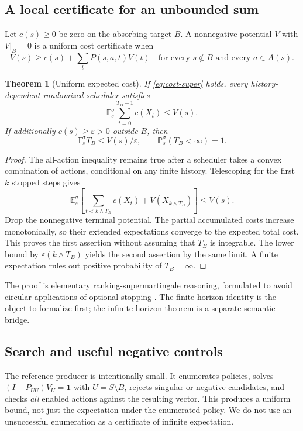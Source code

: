 \documentclass[11pt,letterpaper]{article}
\newtheorem{theorem}{Theorem}[section]
\theoremstyle{definition}\newtheorem{definition}[theorem]{Definition}
\theoremstyle{remark}\newtheorem{remark}[theorem]{Remark}
\newcommand{\E}{\mathbb E}\newcommand{\Prob}{\mathbb P}
\begin{document}
\subsection{A local certificate for an unbounded sum}
Let $c(s)\ge0$ be zero on the absorbing target $B$. A nonnegative potential $V$ with $V|_B=0$ is a uniform cost certificate when
\begin{equation}\label{eq:cost-super}
 V(s)\ge c(s)+\sum_tP(s,a,t)V(t)
 \quad\text{for every }s\notin B\text{ and every }a\in A(s).
\end{equation}

\begin{theorem}[Uniform expected cost]\label{thm:cost}
If \eqref{eq:cost-super} holds, every history-dependent randomized scheduler satisfies
\[
 \E_s^\sigma\sum_{t=0}^{T_B-1}c(X_t)\le V(s).
\]
If additionally $c(s)\ge\varepsilon>0$ outside $B$, then
\[
 \E_s^\sigma T_B\le V(s)/\varepsilon,
 \qquad \Prob_s^\sigma(T_B<\infty)=1.
\]
\end{theorem}
\begin{proof}
The all-action inequality remains true after a scheduler takes a convex combination of actions, conditional on any finite history. Telescoping for the first $k$ stopped steps gives
\[
 \E_s^\sigma\!\left[
 \sum_{t<k\wedge T_B}c(X_t)+V(X_{k\wedge T_B})\right]\le V(s).
\]
Drop the nonnegative terminal potential. The partial accumulated costs increase monotonically, so their extended expectations converge to the expected total cost. This proves the first assertion without assuming that $T_B$ is integrable. The lower bound by $\varepsilon(k\wedge T_B)$ yields the second assertion by the same limit. A finite expectation rules out positive probability of $T_B=\infty$.
\end{proof}
The proof is elementary ranking-supermartingale reasoning, formulated to avoid circular applications of optional stopping \cite{martingales}. The finite-horizon identity is the object to formalize first; the infinite-horizon theorem is a separate semantic bridge.

\subsection{Search and useful negative controls}
The reference producer is intentionally small. It enumerates policies, solves $(I-P_{UU})V_U=\boldsymbol1$ with $U=S\setminus B$, rejects singular or negative candidates, and checks \emph{all} enabled actions against the resulting vector. This produces a uniform bound, not just the expectation under the enumerated policy. We do not use an unsuccessful enumeration as a certificate of infinite expectation.
\end{document}
